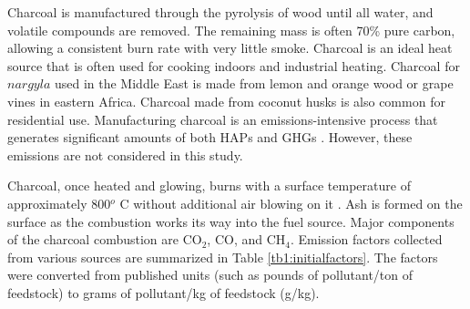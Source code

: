 Charcoal is manufactured through the pyrolysis of wood until all water, and volatile compounds are removed.  The remaining mass is often 70\% pure carbon, allowing a consistent burn rate with very little smoke. Charcoal is an ideal heat source that is often used for cooking indoors and industrial heating.  Charcoal for $nargyla$ used in the Middle East is made from lemon and orange wood or grape vines in eastern Africa.  Charcoal made from coconut husks is also common for residential use.  Manufacturing charcoal is an emissions-intensive process that generates significant amounts of both HAPs and GHGs \citep{Lacaux1994}.  However, these emissions are not considered in this study.

Charcoal, once heated and glowing, burns with a surface temperature of approximately 800$^{o}$ C without additional air blowing on it \citep{Evans1977}.  Ash is formed on the surface as the combustion works its way into the fuel source. Major components of the charcoal combustion are CO$_{2}$, CO, and CH$_{4}$.  Emission factors collected from various sources are summarized in Table \ref{tb1:initialfactors}.  The factors were converted from published units (such as pounds of pollutant/ton of feedstock) to grams of pollutant/kg of feedstock (g/kg).

